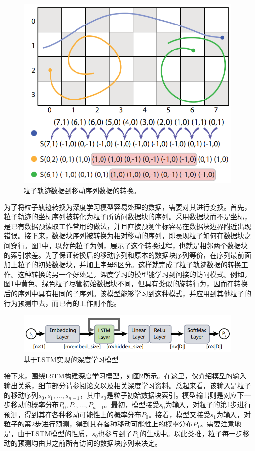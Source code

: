 \begin{figure}[!tb]
  \centering
  \includegraphics[width=.65\linewidth]{image/prefetch/lstm_fig1.png}
  \caption{
    粒子轨迹数据到移动序列数据的转换。\parencite{Hong2018LSTM}
  }
  \label{fig:lstm_fig1}
\end{figure}


为了将粒子轨迹转换为深度学习模型容易处理的数据，需要对其进行变换。首先，粒子轨迹的坐标序列被转化为粒子所访问数据块的序列。采用数据块而不是坐标，是已有数据预读取工作常用的做法，并且直接预测坐标容易在数据块边界附近出现错误。接下来，数据块序列被转换为相对移动的序列，即表现粒子如何在数据块之间穿行。图\ref{fig:lstm_fig1}中，以蓝色粒子为例，展示了这个转换过程，也就是相邻两个数据块的索引求差。为了保证转换后的移动序列和原本的数据块序列等价，在序列最前面加上粒子的初始数据块，并加上字母S区分。这样就完成了粒子轨迹数据的转换工作。这种转换的另一个好处是，深度学习的模型能学习到间接的访问模式。例如，图\ref{fig:lstm_fig1}中黄色、绿色粒子尽管初始数据块不同，但具有类似的旋转行为，因而在转换后的序列中具有相同的子序列。该模型能够学习到这种模式，并应用到其他粒子的行为预测中去，而已有的工作则不能。

\begin{figure}[!tb]
  \centering
  \includegraphics[width=.85\linewidth]{image/prefetch/lstm_fig2.png}
  \caption{
    基于LSTM实现的深度学习模型\parencite{Hong2018LSTM}
  }
  \label{fig:lstm_fig2}
\end{figure}

接下来，围绕LSTM构建深度学习模型，如图\ref{fig:lstm_fig2}所示。在这里，仅介绍模型的输入输出关系，细节部分请参阅论文以及相关深度学习资料。总起来看，该输入是粒子的移动序列$s_0, s_1, …, s_{n-1}$，其中$s_0$是粒子初始数据块索引。模型输出则是对应下一步移动的概率分布$P_0,P_1,…,P_{n-1}$。最初，模型接受$s_0$为输入，对粒子的第1步进行预测，得到其在各种移动可能性上的概率分布$P_0$。接着，模型又接受$s_1$为输入，对粒子的第2步进行预测，得到其在各种移动可能性上的概率分布$P_1$。需要注意地是，由于LSTM模型的性质，$s_0$也参与到了$P_1$的生成中。以此类推，粒子每一步移动的预测均由其之前所有访问的数据块序列来决定。

